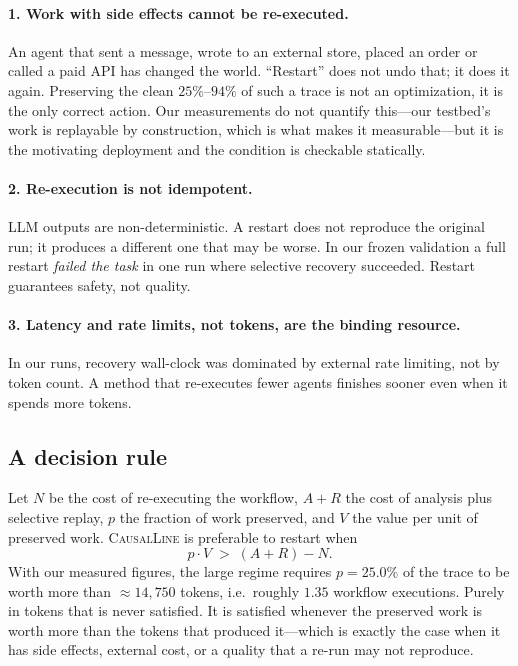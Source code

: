 \documentclass[10pt,twocolumn]{article}
\newcommand{\sys}{\textsc{CausalLine}}
\begin{document}
\paragraph{1. Work with side effects cannot be re-executed.}
An agent that sent a message, wrote to an external store, placed an order or
called a paid API has changed the world. ``Restart'' does not undo that; it
does it again. Preserving the clean $25\%$--$94\%$ of such a trace is not an
optimization, it is the only correct action. Our measurements do not quantify
this---our testbed's work is replayable by construction, which is what makes
it measurable---but it is the motivating deployment and the condition is
checkable statically.

\paragraph{2. Re-execution is not idempotent.}
LLM outputs are non-deterministic. A restart does not reproduce the original
run; it produces a different one that may be worse. In our frozen validation a
full restart \emph{failed the task} in one run where selective recovery
succeeded. Restart guarantees safety, not quality.

\paragraph{3. Latency and rate limits, not tokens, are the binding resource.}
In our runs, recovery wall-clock was dominated by external rate limiting, not
by token count. A method that re-executes fewer agents finishes sooner even
when it spends more tokens.

\subsection{A decision rule}

Let $N$ be the cost of re-executing the workflow, $A+R$ the cost of analysis
plus selective replay, $p$ the fraction of work preserved, and $V$ the value
per unit of preserved work. \sys{} is preferable to restart when
\[
p \cdot V \;>\; (A + R) - N .
\]
With our measured figures, the large regime requires $p=25.0\%$ of the trace
to be worth more than $\approx 14{,}750$ tokens, i.e.\ roughly $1.35$
workflow executions. Purely in tokens that is never satisfied. It is
satisfied whenever the preserved work is worth more than the tokens that
produced it---which is exactly the case when it has side effects, external
cost, or a quality that a re-run may not reproduce.
\end{document}
